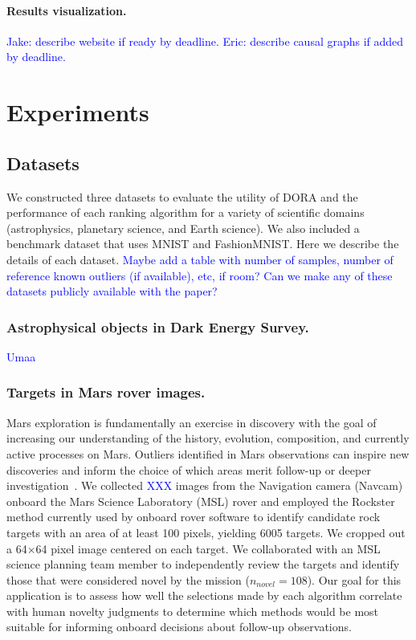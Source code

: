 \documentclass[letterpaper]{article} %
\newcommand{\todo}[1]{\textcolor{blue}{#1}}
\begin{document}
\paragraph{Results visualization.} 
\todo{Jake: describe website if ready by deadline.}
\todo{Eric: describe causal graphs if added by deadline.}

\section{Experiments}

\subsection{Datasets}
We constructed three datasets to evaluate the utility of DORA and the
performance of each ranking algorithm for a variety of scientific domains
 (astrophysics, planetary science, and Earth science). We also included a 
 benchmark dataset that uses MNIST and FashionMNIST. Here we describe
 the details of each dataset.
\todo{Maybe add
 a table with number of samples, number of reference known outliers (if 
 available), etc, if room? }
 \todo{Can we make any of these datasets publicly available with the paper?}

\subsubsection{Astrophysical objects in Dark Energy Survey.}
\todo{Umaa}

\subsubsection{Targets in Mars rover images.}
Mars exploration is fundamentally an exercise in discovery with the
goal of increasing our understanding of the history, evolution,
composition, and currently active processes on Mars.  Outliers
identified in Mars observations can inspire new discoveries and inform
the choice of which areas merit follow-up or deeper
investigation~\cite{kerner2020comparison,wagstaff:rover-novelty20}.
We collected \todo{XXX} images from the Navigation camera (Navcam) 
onboard the Mars Science Laboratory (MSL) rover
and employed the Rockster~\cite{burl:rockster16}
method currently used by onboard rover software to identify candidate rock
targets with an area of at least 100 pixels, yielding \num{6005}
targets.  We cropped out a \num{64}$\times$\num{64} pixel image
centered on each target.
%
We collaborated with an MSL science planning team member to
independently review the targets and identify those that were
considered novel by the mission ($n_{novel} = 108$).  Our goal for
this application is to assess how well the selections made by each
algorithm correlate with human novelty judgments to determine which
methods would be most suitable for informing onboard decisions about
follow-up observations.
\end{document}

